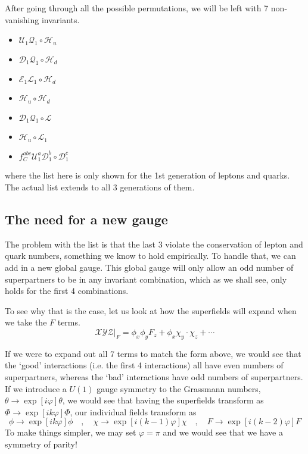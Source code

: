     After going through all the possible permutations, we will be left with 7 non-vanishing invariants.
    \begin{itemize}
    \item $\mathcal{U}_1 \mathcal{Q}_1 \circ \mathcal{H}_u$
    \item $\mathcal{D}_1 \mathcal{Q}_1 \circ \mathcal{H}_d$
    \item $\mathcal{E}_1 \mathcal{L}_1 \circ \mathcal{H}_d$
    \item $\mathcal{H}_u \circ \mathcal{H}_d$
    \item $\mathcal{D}_1 \mathcal{Q}_1 \circ \mathcal{L}$
    \item $\mathcal{H}_u \circ \mathcal{L}_1$
    \item $f^{abc}_C \mathcal{U}_1^a \mathcal{D}_1^b \circ \mathcal{D}_1^c$
    \end{itemize}
    where the list here is only shown for the 1st generation of leptons and quarks. The actual list extends to all 3 generations of them.

  \subsection{The need for a new gauge}
  \label{ch:15:building the mssm:need for new gauge}
  The problem with the list is that the last 3 violate the conservation of lepton and quark numbers, something we know to hold empirically. To handle that, we can add in a new global gauge. This global gauge will only allow an odd number of superpartners to be in any invariant combination, which as we shall see, only holds for the first 4 combinations.

  To see why that is the case, let us look at how the superfields will expand when we take the $F$ terms.
  \begin{equation}
    \left.\mathcal{X}\mathcal{Y}\mathcal{Z}\right\vert_F = \phi_x \phi_y F_z + \phi_x \chi_y \cdot \chi_z + \cdots
  \end{equation}

  If we were to expand out all 7 terms to match the form above, we would see that the `good' interactions (i.e. the first 4 interactions) all have even numbers of superpartners, whereas the `bad' interactions have odd numbers of superpartners. If we introduce a $U(1)$ gauge symmetry to the Grassmann numbers, $\theta \rightarrow \exp[i\varphi] \theta$, we would see that having the superfields transform as $\Phi \rightarrow \exp[ik\varphi] \Phi$, our individual fields transform as
  \begin{equation}
    \phi \rightarrow \exp[ik\varphi] \phi \quad , \quad \chi \rightarrow \exp[i(k-1)\varphi] \chi \quad , \quad F \rightarrow \exp[i(k-2)\varphi] F
  \end{equation}
  To make things simpler, we may set $\varphi = \pi$ and we would see that we have a symmetry of parity!

